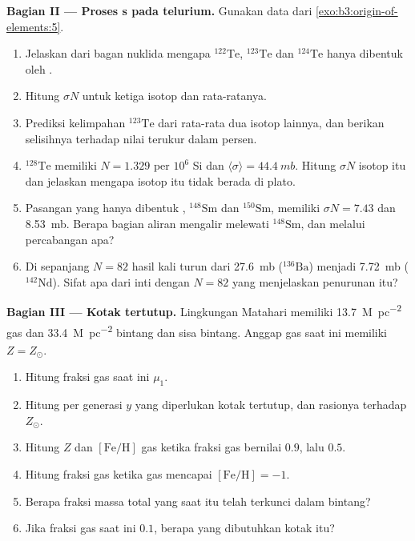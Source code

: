 \begin{problem}
\medskip\noindent\textbf{Bagian II --- Proses s pada telurium.} Gunakan
data dari \cref{exo:b3:origin-of-elements:5}.
\begin{enumerate}[resume]
\item Jelaskan dari bagan nuklida mengapa $^{122}\mathrm{Te}$,
  $^{123}\mathrm{Te}$ dan $^{124}\mathrm{Te}$ hanya dibentuk oleh .
\item Hitung $\sigma N$ untuk ketiga isotop dan rata-ratanya.
\item Prediksi kelimpahan $^{123}\mathrm{Te}$ dari rata-rata
  dua isotop lainnya, dan berikan selisihnya terhadap nilai terukur
  dalam persen.
\item $^{128}\mathrm{Te}$ memiliki $N = 1.329$ per $10^6$ Si dan
  $\langle\sigma\rangle = \qty{44.4}{mb}$. Hitung $\sigma N$ isotop itu dan
  jelaskan mengapa isotop itu tidak berada di plato.
\item Pasangan yang hanya dibentuk , $^{148}\mathrm{Sm}$ dan $^{150}\mathrm{Sm}$, memiliki
  $\sigma N = \num{7.43}$ dan \qty{8.53}{mb}. Berapa bagian aliran
  mengalir melewati $^{148}\mathrm{Sm}$, dan melalui percabangan apa?
\item Di sepanjang $N = 82$ hasil kali turun dari \qty{27.6}{mb}
  ($^{136}\mathrm{Ba}$) menjadi \qty{7.72}{mb} ($^{142}\mathrm{Nd}$). Sifat apa
  dari inti dengan $N = 82$ yang menjelaskan penurunan itu?
\end{enumerate}

\medskip\noindent\textbf{Bagian III --- Kotak tertutup.} Lingkungan
Matahari memiliki \qty{13.7}{M_\odot.pc^{-2}} gas dan
\qty{33.4}{M_\odot.pc^{-2}} bintang dan sisa bintang. Anggap
gas saat ini memiliki $Z = Z_\odot$.
\begin{enumerate}[resume]
\item Hitung fraksi gas saat ini $\mu_1$.
\item Hitung  per generasi $y$ yang diperlukan
  kotak tertutup, dan rasionya terhadap $Z_\odot$.
\item Hitung $Z$ dan $[\mathrm{Fe/H}]$ gas ketika fraksi gas
  bernilai $0.9$, lalu $0.5$.
\item Hitung fraksi gas ketika gas mencapai
  $[\mathrm{Fe/H}] = -1$.
\item Berapa fraksi massa total yang saat itu telah terkunci dalam bintang?
\item Jika fraksi gas saat ini $0.1$, berapa 
  yang dibutuhkan kotak itu?
\end{enumerate}


\end{problem}
